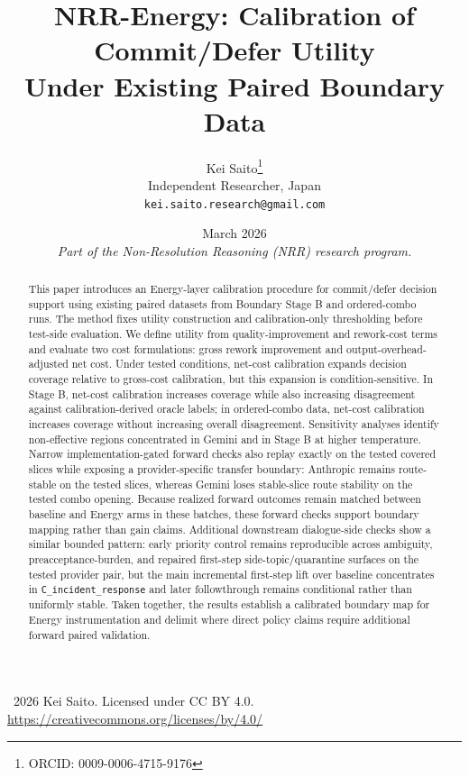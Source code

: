 \documentclass[11pt,a4paper]{article}
\title{\textbf{NRR-Energy: Calibration of Commit/Defer Utility\\Under Existing Paired Boundary Data}}
\author{
  Kei Saito\thanks{ORCID: 0009-0006-4715-9176} \\
  Independent Researcher, Japan \\
  \texttt{kei.saito.research@gmail.com}
}
\date{March 2026 \\[0.5em]
\textit{Part of the Non-Resolution Reasoning (NRR) research program.}}
\begin{document}
\maketitle

\begin{center}
\textcopyright\ 2026 Kei Saito.
Licensed under CC BY 4.0.\\
\url{https://creativecommons.org/licenses/by/4.0/}
\end{center}

\begin{abstract}
This paper introduces an Energy-layer calibration procedure for commit/defer decision support using existing paired datasets from Boundary Stage B and ordered-combo runs. The method fixes utility construction and calibration-only thresholding before test-side evaluation. We define utility from quality-improvement and rework-cost terms and evaluate two cost formulations: gross rework improvement and output-overhead-adjusted net cost. Under tested conditions, net-cost calibration expands decision coverage relative to gross-cost calibration, but this expansion is condition-sensitive. In Stage B, net-cost calibration increases coverage while also increasing disagreement against calibration-derived oracle labels; in ordered-combo data, net-cost calibration increases coverage without increasing overall disagreement. Sensitivity analyses identify non-effective regions concentrated in Gemini and in Stage B at higher temperature. Narrow implementation-gated forward checks also replay exactly on the tested covered slices while exposing a provider-specific transfer boundary: Anthropic remains route-stable on the tested slices, whereas Gemini loses stable-slice route stability on the tested combo opening. Because realized forward outcomes remain matched between baseline and Energy arms in these batches, these forward checks support boundary mapping rather than gain claims. Additional downstream dialogue-side checks show a similar bounded pattern: early priority control remains reproducible across ambiguity, preacceptance-burden, and repaired first-step side-topic/quarantine surfaces on the tested provider pair, but the main incremental first-step lift over baseline concentrates in \texttt{C\_incident\_response} and later followthrough remains conditional rather than uniformly stable. Taken together, the results establish a calibrated boundary map for Energy instrumentation and delimit where direct policy claims require additional forward paired validation.
\end{abstract}
\end{document}
